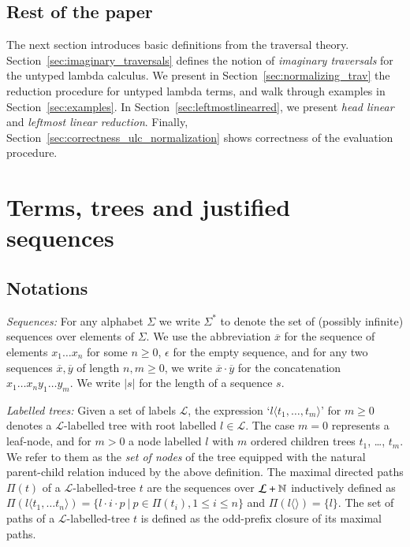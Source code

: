 \documentclass{elsarticle}
\theoremstyle{plain}
\theoremstyle{definition}
\begin{document}
\subsection{Rest of the paper}

The next section introduces basic definitions from the traversal theory. Section~\ref{sec:imaginary_traversals} defines the notion of \emph{imaginary traversals} for the untyped lambda calculus. We present in Section~\ref{sec:normalizing_trav} the reduction procedure for untyped lambda terms, and walk through examples in Section~\ref{sec:examples}. In Section~\ref{sec:leftmostlinearred}, we present \emph{head linear} and \emph{leftmost linear reduction}. Finally, Section~\ref{sec:correctness_ulc_normalization} shows correctness of the evaluation procedure.


\section{Terms, trees and justified sequences}
\label{sec:basic_def}
\subsection{Notations}
\emph{Sequences:} For any alphabet $\Sigma$ we write $\Sigma^*$ to denote the set of (possibly infinite) sequences over elements of $\Sigma$.
 We use the abbreviation $\overline{x}$ for the sequence of elements $x_1 \ldots x_n$ for some $n\geq0$, $\epsilon$ for the empty sequence, and for any two sequences $\overline{x}, \overline{y}$ of length $n,m\geq 0$, we write $\overline{x} \cdot \overline{y}$ for the concatenation $x_1 \ldots x_n y_1 \ldots y_m$. We write $|s|$ for the length of a sequence $s$.

 \emph{Labelled trees:} Given a set of labels $\mathcal{L}$, the expression `$l\langle t_1, \ldots, t_m \rangle$' for $m \geq 0$ denotes a $\mathcal{L}$-labelled tree with root labelled $l\in \mathcal{L}$. The case $m=0$ represents a leaf-node, and for $m>0$ a node labelled $l$ with $m$ ordered children trees $t_1$, \ldots, $t_m$.
 We refer to them as the \emph{set of nodes} of the tree equipped with
 the natural parent-child relation induced by the above definition.
 The maximal directed paths $\Pi(t)$ of a $\mathcal{L}$-labelled-tree $t$ are the sequences over $\mathcal{L} + \mathbb{N}$
 inductively defined as
 $\Pi(l \langle t_1, \ldots t_n \rangle) = \{ l \cdot i \cdot p \ |  \ p \in \Pi(t_i), 1\leq i \leq n \}$ and
 $\Pi(l\langle \rangle) = \{ l \}$.
 The set of paths of a $\mathcal{L}$-labelled-tree $t$ is defined as the odd-prefix closure of its maximal paths.
\end{document}
